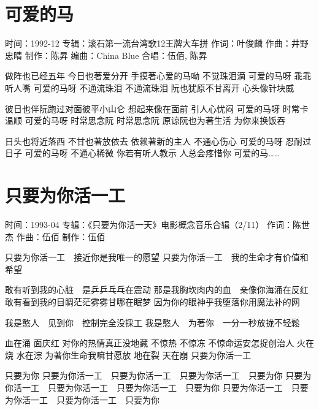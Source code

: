 \documentclass[UTF8,a4paper,oneside,twocolumn,12pt]{ctexbook}
\newcommand{\infopair}[2]{\textbullet #1：#2}
\newcommand{\zc}[1][伍佰]{\infopair{作词}{#1}}
\newcommand{\zq}[1][伍佰]{\infopair{作曲}{#1}}
\newcommand{\bq}[1][伍佰]{\infopair{编曲}{#1}}
\newcommand{\zj}[1]{\infopair{专辑}{#1}}
\newcommand{\zz}[1]{\infopair{制作}{#1}}
\newcommand{\sj}[1]{\infopair{时间}{#1}}
\newenvironment{info}{\begin{flushleft}\kaishu
	}
	{\end{flushleft}\normalsize\yahei\par}
\newenvironment{lyric}{
	}
{}
\begin{document}
\section{可爱的马}
\begin{info}
	\sj{1992-12}
	\zj{滚石第一流台湾歌12王牌大车拼}
	\zc[叶俊麟]
	\zq[井野忠晴]
	\zz{陈昇}
	\bq[China Blue]
	\infopair{合唱}{伍佰, 陈昇}
\end{info}
\begin{lyric}
	做阵也已经五年 今日也著爱分开
	手摸著心爱的马呦 不觉珠泪滴
	可爱的马呀 乖乖听人嘴
	可爱的马呀 不通流珠泪 不通流珠泪
	阮也犹原不甘离开 心头像针块威

	彼日也伴阮跑过对面彼平小山仑
	想起来像在面前 引人心忧闷
	可爱的马呀 时常卡温顺 可爱的马呀
	时常思念阮 时常思念阮
	原谅阮也为著生活 为你来换饭吞

	日头也将近落西 不甘也著放依去
	依赖著新的主人 不通心伤心
	可爱的马呀 忍耐过日子
	可爱的马呀 不通心稀微
	你若有听人教示 人总会疼惜你 可爱的马……
\end{lyric}

\section{只要为你活一工}
\begin{info}
	\sj{1993-04}
	\zj{《只要为你活一天》电影概念音乐合辑（2/11）}
	\zc[陈世杰]
	\zq
	\zz{伍佰}
\end{info}
\begin{lyric}
	只要为你活一工　接近你是我唯一的愿望
	只要为你活一工　我的生命才有价值和希望

	敢有听到我的心脏　是乒乒乓乓在震动
	那是我胸坎肉内的血　亲像你海涌在反红
	敢有看到我的目睭茫茫雾雾甘哪在眠梦
	因为你的眼神乎我堕落你用魔法补的网

	我是憨人　见到你　控制完全没採工
	我是憨人　为著你　一分一秒放拢不轻鬆

	血在涌 面庆红 对你的热情真正没地藏
	不惊热 不惊冻 不惊命运安怎捉创治人
	火在烧 水在淙 为著你生命我嘛甘愿放
	地在裂 天在崩 只要为你活一工

	只要为你
	只要为你活一工　只要为你活一工　只要为你活一工　只要为你
	只要为你活一工　只要为你活一工　只要为你活一工　只要为你
	只要为你活一工　只要为你活一工　只要为你活一工　只要为你
\end{lyric}
\end{document}
